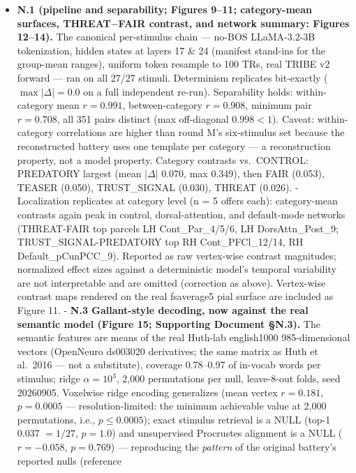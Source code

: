 \documentclass[
]{article}
\providecommand{\tightlist}{%
  \setlength{\itemsep}{0pt}\setlength{\parskip}{0pt}}
\begin{document}
\begin{itemize}
\tightlist
\item
  \textbf{N.1 (pipeline and separability; Figures 9--11; category-mean
  surfaces, THREAT\(-\)FAIR contrast, and network summary: Figures
  12--14).} The canonical per-stimulus chain --- no-BOS LLaMA-3.2-3B
  tokenization, hidden states at layers 17 \& 24 (manifest stand-ins for
  the group-mean ranges), uniform token resample to 100 TRs, real TRIBE
  v2 forward --- ran on all 27/27 stimuli. Determinism replicates
  bit-exactly (\(\max|\Delta| = 0.0\) on a full independent re-run).
  Separability holds: within-category mean \(r = 0.991\),
  between-category \(r = 0.908\), minimum pair \(r = 0.708\), all 351
  pairs distinct (max off-diagonal \(0.998 < 1\)). Caveat:
  within-category correlations are higher than round M's six-stimulus
  set because the reconstructed battery uses one template per category
  --- a reconstruction property, not a model property. Category
  contrasts vs.~CONTROL: PREDATORY largest (mean \(|\Delta|\) 0.070, max
  0.349), then FAIR (0.053), TEASER (0.050), TRUST\_SIGNAL (0.030),
  THREAT (0.026). - Localization replicates at category level (n = 5
  offers each): category-mean contrasts again peak in control,
  dorsal-attention, and default-mode networks (THREAT-FAIR top parcels
  LH Cont\_Par\_4/5/6, LH DorsAttn\_Post\_9; TRUST\_SIGNAL-PREDATORY top
  RH Cont\_PFCl\_12/14, RH Default\_pCunPCC\_9). Reported as raw
  vertex-wise contrast magnitudes; normalized effect sizes against a
  deterministic model's temporal variability are not interpretable and
  are omitted (correction as above). Vertex-wise contrast maps rendered
  on the real fsaverage5 pial surface are included as Figure 11. -
  \textbf{N.3 Gallant-style decoding, now against the real semantic
  model (Figure 15; Supporting Document §N.3).} The semantic features
  are means of the real Huth-lab english1000 985-dimensional vectors
  (OpenNeuro ds003020 derivatives; the same matrix as Huth et al.~2016
  --- not a substitute), coverage 0.78--0.97 of in-vocab words per
  stimulus; ridge \(\alpha = 10^{3}\), 2,000 permutations per null,
  leave-8-out folds, seed 20260905. Voxelwise ridge encoding generalizes
  (mean vertex \(r = 0.181\), \(p = 0.0005\) --- resolution-limited: the
  minimum achievable value at 2,000 permutations, i.e.,
  \(p \leq 0.0005\)); exact stimulus retrieval is a NULL (top-1 0.037
  \(= 1/27\), \(p = 1.0\)) and unsupervised Procrustes alignment is a
  NULL (\(r = -0.058\), \(p = 0.769\)) --- reproducing the
  \emph{pattern} of the original battery's reported nulls (reference

\end{itemize}
\end{document}
